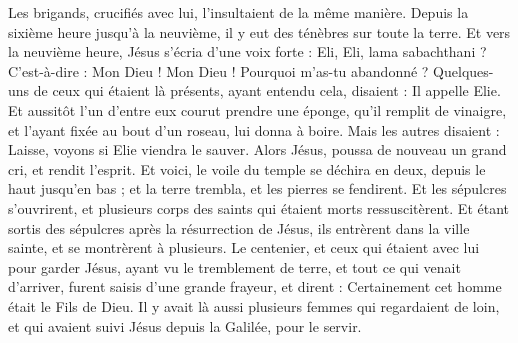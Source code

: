 \begin{multicols}{2}
Les brigands, crucifiés avec lui, l’insultaient de la même manière.
Depuis la sixième heure jusqu’à la neuvième, il y eut des ténèbres sur toute la terre.
Et vers la neuvième heure, Jésus s'écria d’une voix forte : Eli, Eli, lama sabachthani ? C’est-à-dire : Mon Dieu ! Mon Dieu ! Pourquoi m'as-tu abandonné ?
Quelques-uns de ceux qui étaient là présents, ayant entendu cela, disaient : Il appelle Elie.
Et aussitôt l’un d'entre eux courut prendre une éponge, qu’il remplit de vinaigre, et l’ayant fixée au bout d'un roseau, lui donna à boire.
Mais les autres disaient : Laisse, voyons si Elie viendra le sauver.
Alors Jésus, poussa de nouveau un grand cri, et rendit l'esprit.
Et voici, le voile du temple se déchira en deux, depuis le haut jusqu'en bas{} ; et la terre trembla, et les pierres se fendirent.
Et les sépulcres s'ouvrirent, et plusieurs corps des saints qui étaient morts ressuscitèrent.
Et étant sortis des sépulcres après la résurrection de Jésus, ils entrèrent dans la ville sainte, et se montrèrent à plusieurs.
Le centenier, et ceux qui étaient avec lui pour garder Jésus, ayant vu le tremblement de terre, et tout ce qui venait d'arriver, furent saisis d’une grande frayeur, et dirent : Certainement cet homme était le Fils de Dieu.
Il y avait là aussi plusieurs femmes qui regardaient de loin, et qui avaient suivi Jésus depuis la Galilée, pour le servir.

\end{multicols}
